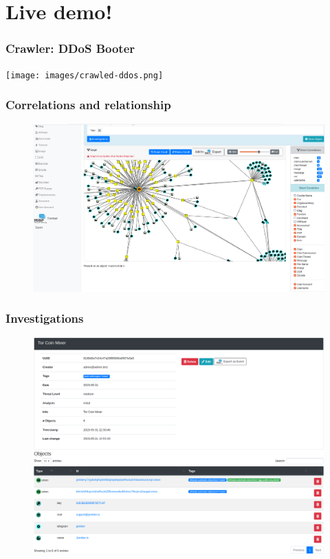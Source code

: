 \documentclass[aspectratio=169]{beamer}
\begin{document}
\section{Live demo!}

\begin{frame}
    \frametitle{Crawler: DDoS Booter}
    \centerline{
        \texttt{[image: images/crawled-ddos.png]}
    }
\end{frame}

\begin{frame}
    \frametitle{Correlations and relationship}
    \begin{figure}
        \includegraphics[scale=0.18, angle=0]{screenshot/correlation.png}
    \end{figure}
\end{frame}

\begin{frame}
    \frametitle{Investigations}
    \begin{figure}
        \includegraphics[scale=0.22, angle=0]{screenshot/investigation_mixer.png}
    \end{figure}
\end{frame}
\end{document}

